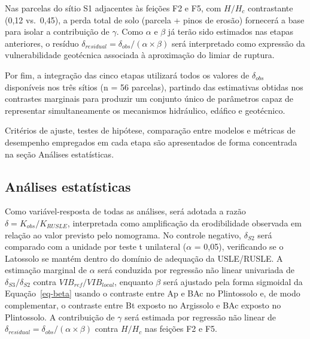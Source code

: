 \documentclass[
  brazilian,
  authoryear,
  preprint]{elsarticle}
\begin{document}
Nas parcelas do sítio S1 adjacentes às feições F2 e F5, com \(H/H_c\)
contrastante (0,12 vs.~0,45), a perda total de solo (parcela + pinos de
erosão) fornecerá a base para isolar a contribuição de \(\gamma\). Como
\(\alpha\) e \(\beta\) já terão sido estimados nas etapas anteriores, o
resíduo \(\delta_{residual} = \delta_{obs} / (\alpha \times \beta)\)
será interpretado como expressão da vulnerabilidade geotécnica associada
à aproximação do limiar de ruptura.

Por fim, a integração das cinco etapas utilizará todos os valores de
\(\delta_{obs}\) disponíveis nos três sítios (n = 56 parcelas), partindo
das estimativas obtidas nos contrastes marginais para produzir um
conjunto único de parâmetros capaz de representar simultaneamente os
mecanismos hidráulico, edáfico e geotécnico.

Critérios de ajuste, testes de hipótese, comparação entre modelos e
métricas de desempenho empregados em cada etapa são apresentados de
forma concentrada na seção Análises estatísticas.

\subsection{Análises estatísticas}\label{anuxe1lises-estatuxedsticas}

Como variável-resposta de todas as análises, será adotada a razão
\(\delta = K_{obs}/K_{RUSLE}\), interpretada como amplificação da
erodibilidade observada em relação ao valor previsto pelo nomograma. No
controle negativo, \(\delta_{S2}\) será comparado com a unidade por
teste t unilateral (\(\alpha\) = 0,05), verificando se o Latossolo se
mantém dentro do domínio de adequação da USLE/RUSLE. A estimação
marginal de \(\alpha\) será conduzida por regressão não linear
univariada de \(\delta_{S3}/\delta_{S2}\) contra
\(VIB_{ref}/VIB_{local}\), enquanto \(\beta\) será ajustado pela forma
sigmoidal da Equação~\ref{eq-beta} usando o contraste entre Ap e BAc no
Plintossolo e, de modo complementar, o contraste entre Bt exposto no
Argissolo e BAc exposto no Plintossolo. A contribuição de \(\gamma\)
será estimada por regressão não linear de
\(\delta_{residual} = \delta_{obs}/(\alpha \times \beta)\) contra
\(H/H_c\) nas feições F2 e F5.
\end{document}

